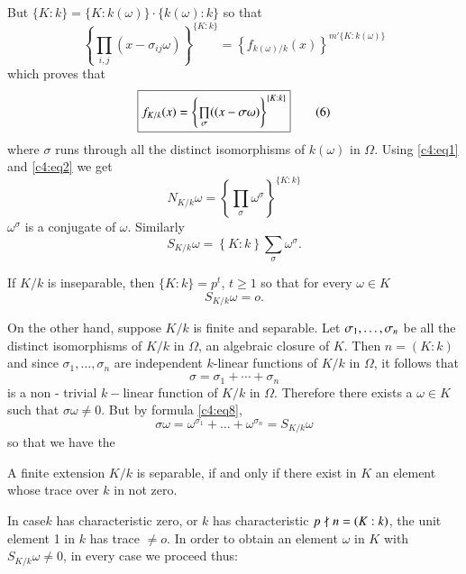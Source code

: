  But $ \{ K : k\} =  \{ K : k (\omega) \} \cdot \{ k(\omega) : k \} $
 so that 
 $$
 \left\{ \prod_{i,j} ( x - \sigma_{ij}\omega) \right\}^{\{
   K:k \}} = \left\{f_{ k(\omega)/k}(x) \right\}^{m' \{ K : k(\omega)\}}   
 $$\pageoriginale
which proves that 
\begin{equation*}
\begin{fbox}{$f_{K/k} (x) = \left\{ \prod \limits_{\sigma} ( ( x - \sigma
    \omega ) \right\} ^{\{ K : k\}}$}\end{fbox} \tag{6}\label{c4:eq6}    
\end{equation*}
 where $ \sigma $ runs through all the distinct isomorphisms of
 $k(\omega)$  in $ \Omega $. Using \eqref{c4:eq1} and \eqref{c4:eq2} we get   
 \begin{equation*}
 N_{K/k} \omega = \left\{ \prod_{\sigma} \omega^\sigma \right\}^{\{ K :
   k\}} \tag{7}\label{c4:eq7}   
 \end{equation*}
 $ \omega^\sigma $ is a conjugate of $\omega$. Similarly  
 \begin{equation*}
S_{K/k} \omega = \left\{ K:k \right\} \sum_{\sigma} \omega^{\sigma}
. \tag{8}\label{c4:eq8}    
 \end{equation*} 
 
 If $ K/k $ is inseparable, then $ \{ K: k\} = p^t$, $t \ge 1 $ so that
 for every $ \omega \in K $ 
 $$
 S_{K/k} \omega = o .
 $$

On the other hand, suppose $ K/k $ is finite and separable. Let $
\sigma_1 ,\break \ldots , \sigma_n $ be all the distinct isomorphisms of $
K/k $ in  $ \Omega $, an algebraic closure of $K$. Then $ n = ( K : k )
$ and since $ \sigma_1 , \ldots , \sigma_n $ are independent  $k$-linear
functions of $ K/k $ in $ \Omega $, it follows that  
$$
\sigma = \sigma_1 + \cdots + \sigma_n 
$$
is a non - trivial $k-$linear function of $ K/k$ in $ \Omega
$. Therefore there exists  a  $ \omega \in K $ such that $ \sigma
\omega \neq 0 $. But by formula \eqref{c4:eq8}, 
$$
\sigma \omega = \omega^{\sigma_1} + \ldots + \omega^{\sigma_n} =
S_{K/k} \omega 
$$
so that we have the 

\begin{thm}\label{c4:thm2}%
 A finite extension $ K/k $ is separable, if and only if there exist
 in $K$ an element whose trace over $k$ in not zero.  
\end{thm}

In case\pageoriginale $k$ has characteristic zero, or $k$ has
characteristic $ p \not\mid n = ( K: k ) $, the unit element 1 in $k$
has trace $ \neq o $. In order  to obtain an element $ \omega $ in $ K
$ with $ S_{K/k} \omega \neq 0 $, in every case we proceed thus:   

